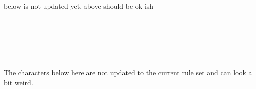 \clearpage
\TODO below is not updated yet, above should be ok-ish

\


%
%
%



%
%
%



\


\


\clearpage
{}
The characters below here are not updated to the current rule set and can look a bit weird.



